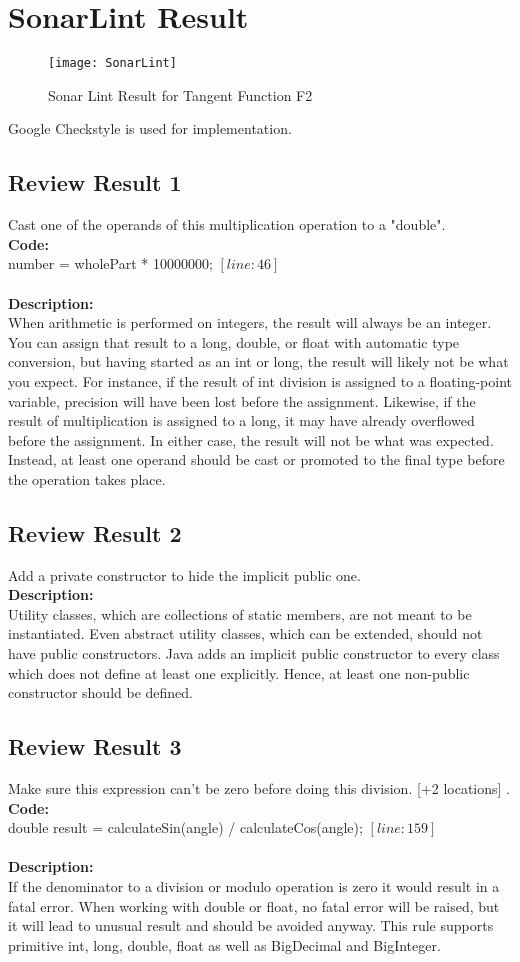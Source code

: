 \documentclass{article}
\begin{document}
\section{SonarLint Result}
\begin{figure}[htp]
    \centering
    \texttt{[image: SonarLint]}
    \caption{Sonar Lint Result for Tangent Function F2}
    \label{fig:galaxy}
\end{figure}
Google Checkstyle is used for implementation.
\subsection{Review Result 1}
Cast one of the operands of this multiplication operation to a "double".\\
\textbf{Code:} 
\\number = wholePart * 10000000; $[ line : 46 ]$\\\\
\textbf{Description:}\\
When arithmetic is performed on integers, the result will always be an integer. You can assign that result to a long, double, or float with automatic type conversion, but having started as an int or long, the result will likely not be what you expect.
For instance, if the result of int division is assigned to a floating-point variable, precision will have been lost before the assignment. Likewise, if the result of multiplication is assigned to a long, it may have already overflowed before the assignment.
In either case, the result will not be what was expected. Instead, at least one operand should be cast or promoted to the final type before the operation takes place.
\subsection{Review Result 2}
Add a private constructor to hide the implicit public one.\\
\textbf{Description:}\\
Utility classes, which are collections of static members, are not meant to be instantiated. Even abstract utility classes, which can be extended, should not have public constructors.
Java adds an implicit public constructor to every class which does not define at least one explicitly. Hence, at least one non-public constructor should be defined.
\subsection{Review Result 3}
Make sure this expression can't be zero before doing this division. [+2 locations]
.\\
\textbf{Code:} 
\\ double result = calculateSin(angle) / calculateCos(angle); $[ line : 159]$\\\\
\textbf{Description:}\\
If the denominator to a division or modulo operation is zero it would result in a fatal error.
When working with double or float, no fatal error will be raised, but it will lead to unusual result and should be avoided anyway.
This rule supports primitive int, long, double, float as well as BigDecimal and BigInteger.
\end{document}
